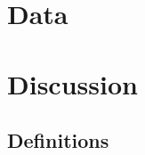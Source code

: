 \documentclass{article} %
\newcounter{source}
\begin{document}

\section {Data}











\section {Discussion}








\subsection{Definitions}
\end{document}
